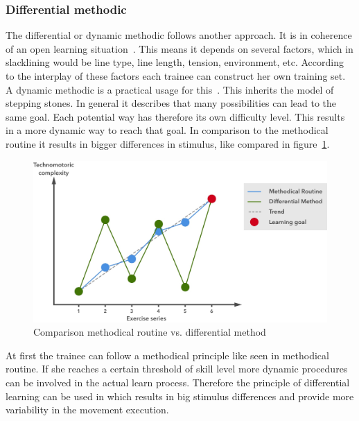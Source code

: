 \subsubsection{Differential methodic}
The differential or dynamic methodic follows another approach. It is in coherence of an open learning situation~\cite{Thomann2013-aa}. This means it depends on several factors, which in slacklining would be line type, line length, tension, environment, etc. According to the interplay of these factors each trainee can construct her own training set. A dynamic methodic is a practical usage for this~\cite{Beck2008-dl, Schoellhorn1999-ip}. This inherits the model of stepping stones. In general it describes that many possibilities can lead to the same goal. Each potential way has therefore its own difficulty level. This results in a more dynamic way to reach that goal. In comparison to the methodical routine it results in bigger differences in stimulus, like compared in figure~\ref{fig:3_3_1_comparisonMethods}. 

\begin{figure}[htb]
	\centering
	\begin{minipage}[t]{1\linewidth}
		\centering
		\includegraphics[width=1\linewidth]{Pictures/3_3_1_comparisonMethod2}
		\caption{Comparison methodical routine vs. differential method~\cite{Thomann2013-aa}}
		\label{fig:3_3_1_comparisonMethods}
	\end{minipage}
\end{figure}
At first the trainee can follow a methodical principle like seen in methodical routine. If she reaches a certain threshold of skill level more dynamic procedures can be involved in the actual learn process. Therefore the principle of differential learning can be used in which results in big stimulus differences and provide more variability in the movement execution.

